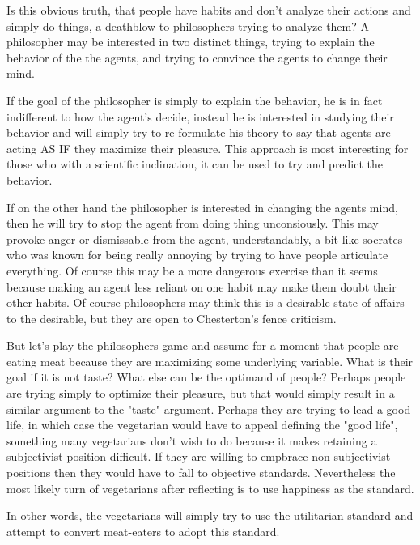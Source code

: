 \documentclass[12pt]{report}
\numberwithin{equation}{section}
\begin{document}
Is this obvious truth, that people have habits and don't analyze their actions and simply do things, a deathblow to philosophers trying to analyze them? A philosopher may be interested in two distinct things, trying to explain the behavior of the the agents, and trying to convince the agents to change their mind. 

If the goal of the philosopher is simply to explain the behavior, he is in fact indifferent to how the agent's decide, instead he is interested in studying their behavior and will simply try to re-formulate his theory to say that agents are acting AS IF they maximize their pleasure. This approach is most interesting for those who with a scientific inclination, it can be used to try and predict the behavior. 

If on the other hand the philosopher is interested in changing the agents mind, then he will try to stop the agent from doing thing unconsiously. This may provoke anger or dismissable from the agent, understandably, a bit like socrates who was known for being really annoying by trying to have people articulate everything. Of course this may be a more dangerous exercise than it seems because making an agent less reliant on one habit may make them doubt their other habits. Of course philosophers may think this is a desirable state of affairs to the desirable, but they are open to Chesterton's fence criticism. 

But let's play the philosophers game and assume for a moment that people are eating meat because they are maximizing some underlying variable. What is their goal if it is not taste? What else can be the optimand of people? Perhaps people are trying simply to optimize their pleasure, but that would simply result in a similar argument to the "taste" argument. Perhaps they are trying to lead a good life, in which case the vegetarian would have to appeal defining the "good life", something many vegetarians don't wish to do because it makes retaining a subjectivist position difficult. If they are willing to empbrace non-subjectivist positions then they would have to fall to objective standards. Nevertheless the most likely turn of vegetarians after reflecting is to use happiness as the standard. 

In other words, the vegetarians will simply try to use the utilitarian standard and attempt to convert meat-eaters to adopt this standard. 

\end{document}
